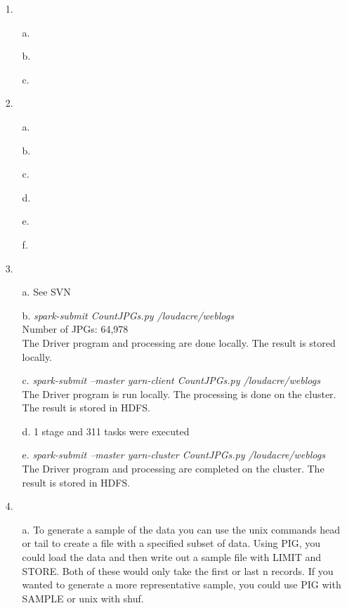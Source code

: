 \documentclass{article}
\begin{document}
\begin{itemize}

\item[1.] 
	\begin{itemize}
		\item[a.]
		\item[b.]
		\item[c.]
	\end{itemize}

\pagebreak
\setlength{\headsep}{5pt}
\item[2.]
	\begin{itemize}
		\item[a.]
		\item[b.]
		\item[c.]
		\item[d.]
		\item[e.]
		\item[f.]
	\end{itemize}
	
\pagebreak
\setlength{\headsep}{5pt}
\item[3.]
	\begin{itemize}
		\item[a.] See SVN
		\item[b.] \textit{spark-submit CountJPGs.py /loudacre/weblogs}\\
		Number of JPGs: 64,978\\
		The Driver program and processing are done locally. The result is stored locally.
		\item[c.] \textit{spark-submit --master yarn-client CountJPGs.py /loudacre/weblogs}\\
		The Driver program is run locally. The processing is done on the cluster. The result is stored in HDFS.
		\item[d.] 1 stage and 311 tasks were executed
		\item[e.] \textit{spark-submit --master yarn-cluster CountJPGs.py /loudacre/weblogs}\\
		The Driver program and processing are completed on the cluster. The result is stored in HDFS.
	\end{itemize}
	
\pagebreak
\setlength{\headsep}{5pt}
\item[4.]
	\begin{itemize}
		\item[a.] To generate a sample of the data you can use the unix commands head or tail to create a file with a specified subset of data. Using PIG, you could load the data and then write out a sample file with LIMIT and STORE. Both of these would only take the first or last n records. If you wanted to generate a more representative sample, you could use PIG with SAMPLE or unix with shuf.\\
		

\end{itemize}
\end{itemize}
\end{document}
